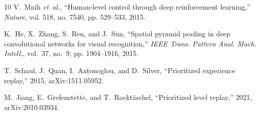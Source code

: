 \documentclass[conference]{IEEEtran}
\begin{document}
\begin{thebibliography}{10}
V.~Mnih \emph{et~al.}, ``Human-level control through deep reinforcement
  learning,'' \emph{Nature}, vol. 518, no. 7540, pp. 529--533, 2015.

K.~He, X.~Zhang, S.~Ren, and J.~Sun, ``Spatial pyramid pooling in deep
  convolutional networks for visual recognition,'' \emph{IEEE Trans. Pattern
  Anal. Mach. Intell.}, vol.~37, no.~9, pp. 1904--1916, 2015.

T.~Schaul, J.~Quan, I.~Antonoglou, and D.~Silver, ``Prioritized experience
  replay,'' 2015, arXiv:1511.05952.

M.~Jiang, E.~Grefenstette, and T.~Rockt{\"a}schel, ``Prioritized level
  replay,'' 2021, arXiv:2010.03934.

\end{thebibliography}
\end{document}
